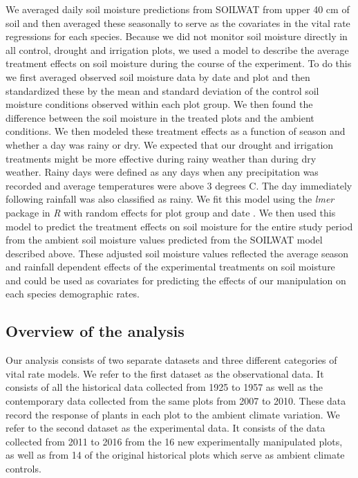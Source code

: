 \documentclass[11pt]{article}
\begin{document}
\begin{doublespacing}
We averaged daily soil moisture predictions from SOILWAT from upper 40 cm of soil and then averaged these seasonally to serve as the covariates in the vital rate regressions for each species. Because we did not monitor soil moisture directly in all control, drought and irrigation plots, we used a model to describe the average treatment effects on soil moisture during the course of the experiment. To do this we first averaged observed soil moisture data by date and plot and then standardized these by the mean and standard deviation of the control soil moisture conditions observed within each plot group. We then found the difference between the soil moisture in the treated plots and the ambient conditions. We then modeled these treatment effects as a function of season and whether a day was rainy or dry. We expected that our drought and irrigation treatments might be more effective during rainy weather than during dry weather. Rainy days were defined as any days when any precipitation was recorded and average temperatures were above 3 degrees C. The day immediately following rainfall was also classified as rainy. We fit this model using the \textit{lmer} package in \textit{R} with random effects for plot group and date \citep{bates_fitting_2015}. We then used this model to predict the treatment effects on soil moisture for the entire study period from the ambient soil moisture values predicted from the SOILWAT model described above. These adjusted soil moisture values reflected the average season and rainfall dependent effects of the experimental treatments on soil moisture and could be used as covariates for predicting the effects of our manipulation on each species demographic rates. 


\subsection*{Overview of the analysis}

Our analysis consists of two separate datasets and three different categories of vital rate models. We refer to the first dataset as the observational data. It consists of all the historical data collected from 1925 to 1957 as well as the contemporary data collected from the same plots from 2007 to 2010. These data record the response of plants in each plot to the ambient climate variation. We refer to the second dataset as the experimental data.  It consists of the data collected from 2011 to 2016 from the 16 new experimentally manipulated plots, as well as from 14 of the original historical plots which serve as ambient climate controls.  


\end{doublespacing}
\end{document}
